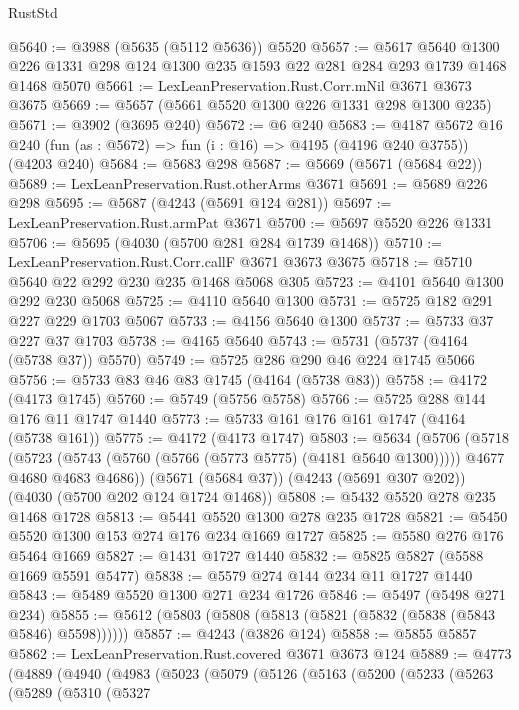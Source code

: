 \begin{lexlean}{RustStd}
\begin{coremodule}
@5640 := @3988 (@5635 (@5112 @5636)) @5520
@5657 := @5617
    @5640
    @1300
    @226
    @1331
    @298
    @124
    @1300
    @235
    @1593
    @22
    @281
    @284
    @293
    @1739
    @1468
    @1468
    @5070
@5661 := LexLeanPreservation.Rust.Corr.mNil @3671 @3673 @3675
@5669 := @5657 (@5661 @5520 @1300 @226 @1331 @298 @1300 @235)
@5671 := @3902 (@3695 @240)
@5672 := @6 @240
@5683 := @4187
    @5672
    @16
    @240
    (fun (as : @5672) => fun (i : @16) => @4195 (@4196 @240 @3755))
    (@4203 @240)
@5684 := @5683 @298
@5687 := @5669 (@5671 (@5684 @22))
@5689 := LexLeanPreservation.Rust.otherArms @3671
@5691 := @5689 @226 @298
@5695 := @5687 (@4243 (@5691 @124 @281))
@5697 := LexLeanPreservation.Rust.armPat @3671
@5700 := @5697 @5520 @226 @1331
@5706 := @5695 (@4030 (@5700 @281 @284 @1739 @1468))
@5710 := LexLeanPreservation.Rust.Corr.callF @3671 @3673 @3675
@5718 := @5710 @5640 @22 @292 @230 @235 @1468 @5068 @305
@5723 := @4101 @5640 @1300 @292 @230 @5068
@5725 := @4110 @5640 @1300
@5731 := @5725 @182 @291 @227 @229 @1703 @5067
@5733 := @4156 @5640 @1300
@5737 := @5733 @37 @227 @37 @1703
@5738 := @4165 @5640
@5743 := @5731 (@5737 (@4164 (@5738 @37)) @5570)
@5749 := @5725 @286 @290 @46 @224 @1745 @5066
@5756 := @5733 @83 @46 @83 @1745 (@4164 (@5738 @83))
@5758 := @4172 (@4173 @1745)
@5760 := @5749 (@5756 @5758)
@5766 := @5725 @288 @144 @176 @11 @1747 @1440
@5773 := @5733 @161 @176 @161 @1747 (@4164 (@5738 @161))
@5775 := @4172 (@4173 @1747)
@5803 := @5634
    (@5706
      (@5718
        (@5723 (@5743 (@5760 (@5766 (@5773 @5775) (@4181 @5640 @1300)))))
        @4677
        @4680
        @4683
        @4686))
    (@5671 (@5684 @37))
    (@4243 (@5691 @307 @202))
    (@4030 (@5700 @202 @124 @1724 @1468))
@5808 := @5432 @5520 @278 @235 @1468 @1728
@5813 := @5441 @5520 @1300 @278 @235 @1728
@5821 := @5450 @5520 @1300 @153 @274 @176 @234 @1669 @1727
@5825 := @5580 @276 @176 @5464 @1669
@5827 := @1431 @1727 @1440
@5832 := @5825 @5827 (@5588 @1669 @5591 @5477)
@5838 := @5579 @274 @144 @234 @11 @1727 @1440
@5843 := @5489 @5520 @1300 @271 @234 @1726
@5846 := @5497 (@5498 @271 @234)
@5855 := @5612 (@5803 (@5808 (@5813 (@5821 (@5832 (@5838 (@5843 @5846) @5598))))))
@5857 := @4243 (@3826 @124)
@5858 := @5855 @5857
@5862 := LexLeanPreservation.Rust.covered @3671 @3673 @124
@5889 := @4773
    (@4889
      (@4940
        (@4983
          (@5023
            (@5079
              (@5126
                (@5163
                  (@5200
                    (@5233
                      (@5263
                        (@5289
                          (@5310
                            (@5327

\end{coremodule}
\end{lexlean}

